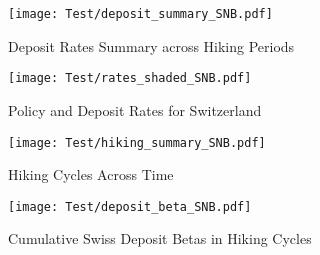 \documentclass{article}
\begin{document}
\begin{figure}[h]
    \centering
    \texttt{[image: Test/deposit\_summary\_SNB.pdf]}
    \caption{Deposit Rates Summary across Hiking Periods}
    \label{fig:deposit_summary}
\end{figure}

\begin{figure}[h]
    \centering
    \texttt{[image: Test/rates\_shaded\_SNB.pdf]}
    \caption{Policy and Deposit Rates for Switzerland}
    \label{fig:rates_shaded}
\end{figure}

\begin{figure}[h]
    \centering
    \texttt{[image: Test/hiking\_summary\_SNB.pdf]}
    \caption{Hiking Cycles Across Time}
    \label{fig:your_pdf}
\end{figure}

\begin{figure}[h]
    \centering
    \texttt{[image: Test/deposit\_beta\_SNB.pdf]}
    \caption{Cumulative Swiss Deposit Betas in Hiking Cycles}
    \label{fig:your_pdf}
\end{figure}

\newpage  %
\printbibliography[title={References}]  %
\end{document}
